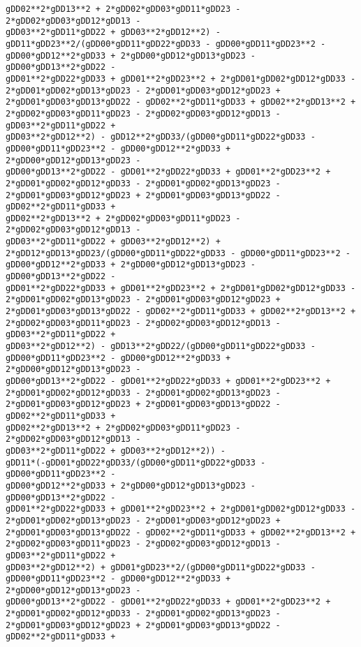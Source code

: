 \documentclass[landscape,letterpaper,10pt,english]{article}
\begin{document}
\begin{Verbatim}[commandchars=\\\{\}]
gDD02**2*gDD13**2 + 2*gDD02*gDD03*gDD11*gDD23 - 2*gDD02*gDD03*gDD12*gDD13 -
gDD03**2*gDD11*gDD22 + gDD03**2*gDD12**2) -
gDD11*gDD23**2/(gDD00*gDD11*gDD22*gDD33 - gDD00*gDD11*gDD23**2 -
gDD00*gDD12**2*gDD33 + 2*gDD00*gDD12*gDD13*gDD23 - gDD00*gDD13**2*gDD22 -
gDD01**2*gDD22*gDD33 + gDD01**2*gDD23**2 + 2*gDD01*gDD02*gDD12*gDD33 -
2*gDD01*gDD02*gDD13*gDD23 - 2*gDD01*gDD03*gDD12*gDD23 +
2*gDD01*gDD03*gDD13*gDD22 - gDD02**2*gDD11*gDD33 + gDD02**2*gDD13**2 +
2*gDD02*gDD03*gDD11*gDD23 - 2*gDD02*gDD03*gDD12*gDD13 - gDD03**2*gDD11*gDD22 +
gDD03**2*gDD12**2) - gDD12**2*gDD33/(gDD00*gDD11*gDD22*gDD33 -
gDD00*gDD11*gDD23**2 - gDD00*gDD12**2*gDD33 + 2*gDD00*gDD12*gDD13*gDD23 -
gDD00*gDD13**2*gDD22 - gDD01**2*gDD22*gDD33 + gDD01**2*gDD23**2 +
2*gDD01*gDD02*gDD12*gDD33 - 2*gDD01*gDD02*gDD13*gDD23 -
2*gDD01*gDD03*gDD12*gDD23 + 2*gDD01*gDD03*gDD13*gDD22 - gDD02**2*gDD11*gDD33 +
gDD02**2*gDD13**2 + 2*gDD02*gDD03*gDD11*gDD23 - 2*gDD02*gDD03*gDD12*gDD13 -
gDD03**2*gDD11*gDD22 + gDD03**2*gDD12**2) +
2*gDD12*gDD13*gDD23/(gDD00*gDD11*gDD22*gDD33 - gDD00*gDD11*gDD23**2 -
gDD00*gDD12**2*gDD33 + 2*gDD00*gDD12*gDD13*gDD23 - gDD00*gDD13**2*gDD22 -
gDD01**2*gDD22*gDD33 + gDD01**2*gDD23**2 + 2*gDD01*gDD02*gDD12*gDD33 -
2*gDD01*gDD02*gDD13*gDD23 - 2*gDD01*gDD03*gDD12*gDD23 +
2*gDD01*gDD03*gDD13*gDD22 - gDD02**2*gDD11*gDD33 + gDD02**2*gDD13**2 +
2*gDD02*gDD03*gDD11*gDD23 - 2*gDD02*gDD03*gDD12*gDD13 - gDD03**2*gDD11*gDD22 +
gDD03**2*gDD12**2) - gDD13**2*gDD22/(gDD00*gDD11*gDD22*gDD33 -
gDD00*gDD11*gDD23**2 - gDD00*gDD12**2*gDD33 + 2*gDD00*gDD12*gDD13*gDD23 -
gDD00*gDD13**2*gDD22 - gDD01**2*gDD22*gDD33 + gDD01**2*gDD23**2 +
2*gDD01*gDD02*gDD12*gDD33 - 2*gDD01*gDD02*gDD13*gDD23 -
2*gDD01*gDD03*gDD12*gDD23 + 2*gDD01*gDD03*gDD13*gDD22 - gDD02**2*gDD11*gDD33 +
gDD02**2*gDD13**2 + 2*gDD02*gDD03*gDD11*gDD23 - 2*gDD02*gDD03*gDD12*gDD13 -
gDD03**2*gDD11*gDD22 + gDD03**2*gDD12**2)) -
gDD11*(-gDD01*gDD22*gDD33/(gDD00*gDD11*gDD22*gDD33 - gDD00*gDD11*gDD23**2 -
gDD00*gDD12**2*gDD33 + 2*gDD00*gDD12*gDD13*gDD23 - gDD00*gDD13**2*gDD22 -
gDD01**2*gDD22*gDD33 + gDD01**2*gDD23**2 + 2*gDD01*gDD02*gDD12*gDD33 -
2*gDD01*gDD02*gDD13*gDD23 - 2*gDD01*gDD03*gDD12*gDD23 +
2*gDD01*gDD03*gDD13*gDD22 - gDD02**2*gDD11*gDD33 + gDD02**2*gDD13**2 +
2*gDD02*gDD03*gDD11*gDD23 - 2*gDD02*gDD03*gDD12*gDD13 - gDD03**2*gDD11*gDD22 +
gDD03**2*gDD12**2) + gDD01*gDD23**2/(gDD00*gDD11*gDD22*gDD33 -
gDD00*gDD11*gDD23**2 - gDD00*gDD12**2*gDD33 + 2*gDD00*gDD12*gDD13*gDD23 -
gDD00*gDD13**2*gDD22 - gDD01**2*gDD22*gDD33 + gDD01**2*gDD23**2 +
2*gDD01*gDD02*gDD12*gDD33 - 2*gDD01*gDD02*gDD13*gDD23 -
2*gDD01*gDD03*gDD12*gDD23 + 2*gDD01*gDD03*gDD13*gDD22 - gDD02**2*gDD11*gDD33 +

\end{Verbatim}
\end{document}
